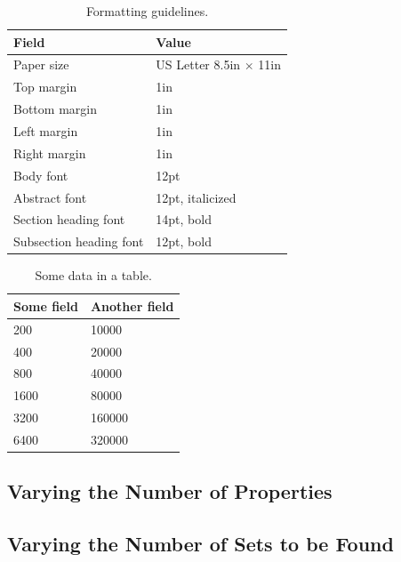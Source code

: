 \documentclass[pageno]{jpaper}
\begin{document}
\begin{table}[hbt]
  \centering
  \begin{tabular}{|l|l|}
    \hline
    \textbf{Field} & \textbf{Value}\\
    \hline
    \hline
    Paper size & US Letter 8.5in $\times$ 11in\\
    \hline
    Top margin & 1in\\
    \hline
    Bottom margin & 1in\\
    \hline
    Left margin & 1in\\
    \hline
    Right margin & 1in\\
    \hline
    Body font & 12pt\\
    \hline
    Abstract font & 12pt, italicized\\
    \hline
    Section heading font & 14pt, bold\\
    \hline
    Subsection heading font & 12pt, bold\\
    \hline
  \end{tabular}
  \caption{Formatting guidelines. }
  \label{table:formatting}
\end{table}

\begin{table}[hbt]
  \centering
  \begin{tabular}{|l|l|} \hline
    \textbf{Some field} & \textbf{Another field}\\\hline
    200          &  10000 \\ \hline 
    400          &  20000 \\ \hline 
    800          &  40000 \\ \hline 
    1600        &  80000 \\ \hline 
    3200        &  160000 \\ \hline 
    6400        &  320000 \\ \hline 
  \end{tabular}
  \caption{Some data in a table. }
  \label{table:data}
\end{table}


\subsection{Varying the Number of Properties}

\subsection{Varying the Number of Sets to be Found}
\end{document}

